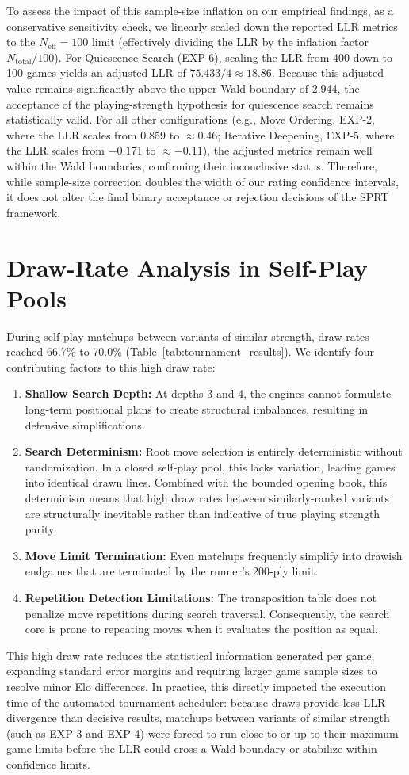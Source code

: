 To assess the impact of this sample-size inflation on our empirical findings, as a conservative sensitivity check, we linearly scaled down the reported LLR metrics to the $N_{\text{eff}} = 100$ limit (effectively dividing the LLR by the inflation factor $N_{\text{total}}/100$). For Quiescence Search (EXP-6), scaling the LLR from 400 down to 100 games yields an adjusted LLR of $75.433 / 4 \approx 18.86$. Because this adjusted value remains significantly above the upper Wald boundary of 2.944, the acceptance of the playing-strength hypothesis for quiescence search remains statistically valid. For all other configurations (e.g., Move Ordering, EXP-2, where the LLR scales from 0.859 to $\approx 0.46$; Iterative Deepening, EXP-5, where the LLR scales from $-$0.171 to $\approx -0.11$), the adjusted metrics remain well within the Wald boundaries, confirming their inconclusive status. Therefore, while sample-size correction doubles the width of our rating confidence intervals, it does not alter the final binary acceptance or rejection decisions of the SPRT framework.

\section{Draw-Rate Analysis in Self-Play Pools}
During self-play matchups between variants of similar strength, draw rates reached 66.7\% to 70.0\% (Table~\ref{tab:tournament_results}). We identify four contributing factors to this high draw rate:
\begin{enumerate}
    \item \textbf{Shallow Search Depth:} At depths 3 and 4, the engines cannot formulate long-term positional plans to create structural imbalances, resulting in defensive simplifications.
    \item \textbf{Search Determinism:} Root move selection is entirely deterministic without randomization. In a closed self-play pool, this lacks variation, leading games into identical drawn lines. Combined with the bounded opening book, this determinism means that high draw rates between similarly-ranked variants are structurally inevitable rather than indicative of true playing strength parity.
    \item \textbf{Move Limit Termination:} Even matchups frequently simplify into drawish endgames that are terminated by the runner's 200-ply limit.
    \item \textbf{Repetition Detection Limitations:} The transposition table does not penalize move repetitions during search traversal. Consequently, the search core is prone to repeating moves when it evaluates the position as equal.
\end{enumerate}
This high draw rate reduces the statistical information generated per game, expanding standard error margins and requiring larger game sample sizes to resolve minor Elo differences. In practice, this directly impacted the execution time of the automated tournament scheduler: because draws provide less LLR divergence than decisive results, matchups between variants of similar strength (such as EXP-3 and EXP-4) were forced to run close to or up to their maximum game limits before the LLR could cross a Wald boundary or stabilize within confidence limits.

